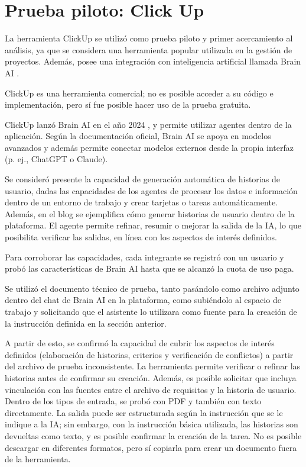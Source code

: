 \section{Prueba piloto: Click Up}

La herramienta ClickUp \cite{clickup} se utilizó como prueba piloto y primer acercamiento al análisis, ya que se considera una herramienta popular utilizada en la gestión de proyectos. Además, posee una integración con inteligencia artificial llamada Brain AI \cite{brainai}.

ClickUp es una herramienta comercial; no es posible acceder a su código e implementación, pero sí fue posible hacer uso de la prueba gratuita.

ClickUp lanzó Brain AI en el año 2024 \cite{brainai}, y permite utilizar agentes dentro de la aplicación. Según la documentación oficial, Brain AI se apoya en modelos avanzados y además permite conectar modelos externos desde la propia interfaz (p. ej., ChatGPT o Claude). \cite{clickupai,clickupai2} %

Se consideró presente la capacidad de generación automática de historias de usuario, dadas las capacidades de los agentes de procesar los datos e información dentro de un entorno de trabajo y crear tarjetas o tareas automáticamente. Además, en el blog \cite{clickupai3} se ejemplifica cómo generar historias de usuario dentro de la plataforma. El agente permite refinar, resumir o mejorar la salida de la IA, lo que posibilita verificar las salidas, en línea con los aspectos de interés definidos.

Para corroborar las capacidades, cada integrante se registró con un usuario y probó las características de Brain AI hasta que se alcanzó la cuota de uso paga.

Se utilizó el documento técnico de prueba, tanto pasándolo como archivo adjunto dentro del chat de Brain AI en la plataforma, como subiéndolo al espacio de trabajo y solicitando que el asistente lo utilizara como fuente para la creación de la instrucción definida en la sección anterior.

A partir de esto, se confirmó la capacidad de cubrir los aspectos de interés definidos (elaboración de historias, criterios y verificación de conflictos) a partir del archivo de prueba inconsistente. La herramienta permite verificar o refinar las historias antes de confirmar su creación. Además, es posible solicitar que incluya vinculación con las fuentes entre el archivo de requisitos y la historia de usuario. Dentro de los tipos de entrada, se probó con PDF y también con texto directamente. La salida puede ser estructurada según la instrucción que se le indique a la IA; sin embargo, con la instrucción básica utilizada, las historias son devueltas como texto, y es posible confirmar la creación de la tarea. No es posible descargar en diferentes formatos, pero sí copiarla para crear un documento fuera de la herramienta.

